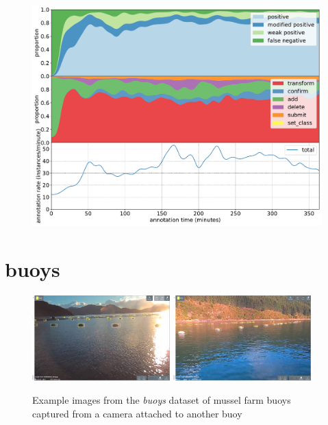\begin{figure}[!h]
\centering
\includegraphics[width=1.0\linewidth]{charts/action_annotations/apples2.pdf}
\caption{  }
\label{fig:apples2_annotation}
\end{figure}

\pagebreak
\section{buoys}

\begin{figure}[H]
  \includegraphics[width=0.475\textwidth]{figures/annotation/screenshots/buoys.png}
  \hfill
  \includegraphics[width=0.475\textwidth]{figures/annotation/screenshots/buoys2.png}
  \caption{Example images from the \emph{buoys} dataset of mussel farm buoys captured from a camera attached to another buoy }
  \label{fig:buoys_dataset}
\end{figure}

